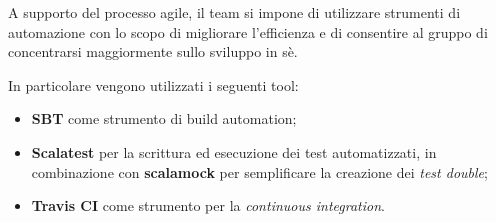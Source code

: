 A supporto del processo agile, il team si impone di utilizzare strumenti di automazione con lo scopo di migliorare l'efficienza e di consentire al gruppo di concentrarsi maggiormente sullo sviluppo in sè.

In particolare vengono utilizzati i seguenti tool:
%
\begin{itemize}
    \item \textbf{SBT} come strumento di build automation;
    \item \textbf{Scalatest} per la scrittura ed esecuzione dei test automatizzati, in combinazione con \textbf{scalamock} per semplificare la creazione dei \textit{test double};
    \item \textbf{Travis CI} come strumento per la \textit{continuous integration}.
\end{itemize}

